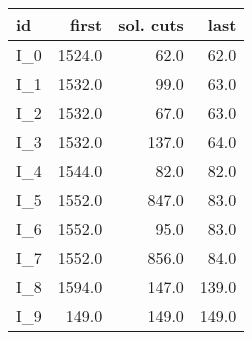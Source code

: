 \begin{tabular}{lrrr}
\toprule
   id &  first &  sol. cuts &  last \\
\midrule
 I\_0 & 1524.0 &       62.0 &  62.0 \\
 I\_1 & 1532.0 &       99.0 &  63.0 \\
 I\_2 & 1532.0 &       67.0 &  63.0 \\
 I\_3 & 1532.0 &      137.0 &  64.0 \\
 I\_4 & 1544.0 &       82.0 &  82.0 \\
 I\_5 & 1552.0 &      847.0 &  83.0 \\
 I\_6 & 1552.0 &       95.0 &  83.0 \\
 I\_7 & 1552.0 &      856.0 &  84.0 \\
 I\_8 & 1594.0 &      147.0 & 139.0 \\
 I\_9 &  149.0 &      149.0 & 149.0 \\
\bottomrule
\end{tabular}
